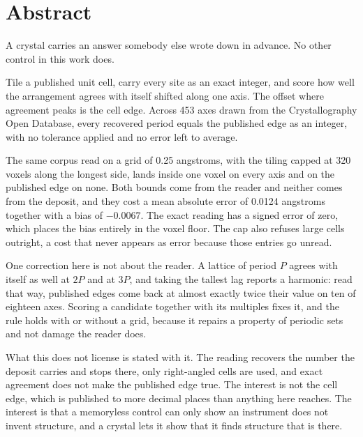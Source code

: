 \chapter*{Abstract}

A crystal carries an answer somebody else wrote down in advance. No other control in this work does.

Tile a published unit cell, carry every site as an exact integer, and score how well the arrangement
agrees with itself shifted along one axis. The offset where agreement peaks is the cell edge. Across
453 axes drawn from the Crystallography Open Database, every recovered period equals the published
edge as an integer, with no tolerance applied and no error left to average.

The same corpus read on a grid of 0.25 angstroms, with the tiling capped at 320 voxels along the
longest side, lands inside one voxel on every axis and on the published edge on none. Both bounds
come from the reader and neither comes from the deposit, and they cost a mean absolute error of
0.0124 angstroms together with a bias of $-0.0067$. The exact reading has a signed error of zero,
which places the bias entirely in the voxel floor. The cap also refuses large cells outright, a cost
that never appears as error because those entries go unread.

One correction here is not about the reader. A lattice of period $P$ agrees with itself as well at
$2P$ and at $3P$, and taking the tallest lag reports a harmonic: read that way, published edges come
back at almost exactly twice their value on ten of eighteen axes. Scoring a candidate together with
its multiples fixes it, and the rule holds with or without a grid, because it repairs a property of
periodic sets and not damage the reader does.

What this does not license is stated with it. The reading recovers the number the deposit carries
and stops there, only right-angled cells are used, and exact agreement does not make the
published edge true. The interest is not the cell edge, which is published to more decimal places
than anything here reaches. The interest is that a memoryless control can only show an instrument
does not invent structure, and a crystal lets it show that it finds structure that is there.
\cleardoublepage
